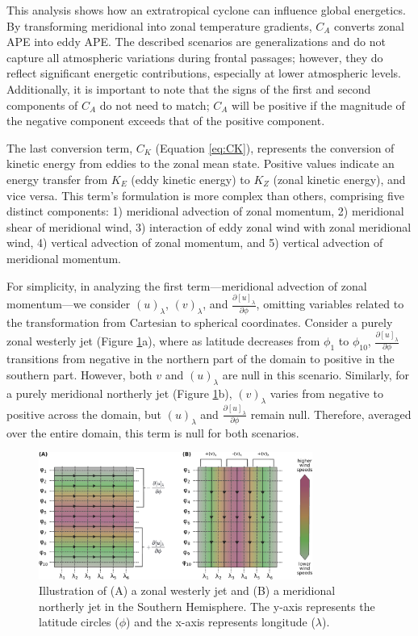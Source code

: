 This analysis shows how an extratropical cyclone can influence global energetics. By transforming meridional into zonal temperature gradients, $C_A$ converts zonal APE into eddy APE. The described scenarios are generalizations and do not capture all atmospheric variations during frontal passages; however, they do reflect significant energetic contributions, especially at lower atmospheric levels. Additionally, it is important to note that the signs of the first and second components of $C_A$ do not need to match; $C_A$ will be positive if the magnitude of the negative component exceeds that of the positive component.


The last conversion term, $C_K$ (Equation \ref{eq:CK}), represents the conversion of kinetic energy from eddies to the zonal mean state. Positive values indicate an energy transfer from $K_E$ (eddy kinetic energy) to $K_Z$ (zonal kinetic energy), and vice versa. This term's formulation is more complex than others, comprising five distinct components: 1) meridional advection of zonal momentum, 2) meridional shear of meridional wind, 3) interaction of eddy zonal wind with zonal meridional wind, 4) vertical advection of zonal momentum, and 5) vertical advection of meridional momentum.

For simplicity, in analyzing the first term—meridional advection of zonal momentum—we consider \( (u)_\lambda \), \( (v)_\lambda \), and \( \frac{\partial [u]_\lambda}{\partial \phi} \), omitting variables related to the transformation from Cartesian to spherical coordinates. Consider a purely zonal westerly jet (Figure \ref{fig:Ck_1}a), where as latitude decreases from \( \phi_1 \) to \( \phi_{10} \), \( \frac{\partial [u]_\lambda}{\partial \phi} \) transitions from negative in the northern part of the domain to positive in the southern part. However, both \( v \) and \( (u)_\lambda \) are null in this scenario. Similarly, for a purely meridional northerly jet (Figure \ref{fig:Ck_1}b), \( (v)_\lambda \) varies from negative to positive across the domain, but \( (u)_\lambda \) and \( \frac{\partial [u]_\lambda}{\partial \phi} \) remain null. Therefore, averaged over the entire domain, this term is null for both scenarios.

\begin{figure}[h]
\begin{center}
\includegraphics[width=0.8\textwidth]{fig/Ck_1.pdf}
\caption[Zonal and Meridional Jets]{Illustration of (A) a zonal westerly jet and (B) a meridional northerly jet in the Southern Hemisphere. The y-axis represents the latitude circles (\(\phi\)) and the x-axis represents longitude (\(\lambda\)).}
\label{fig:Ck_1}
\end{center}
\end{figure}


